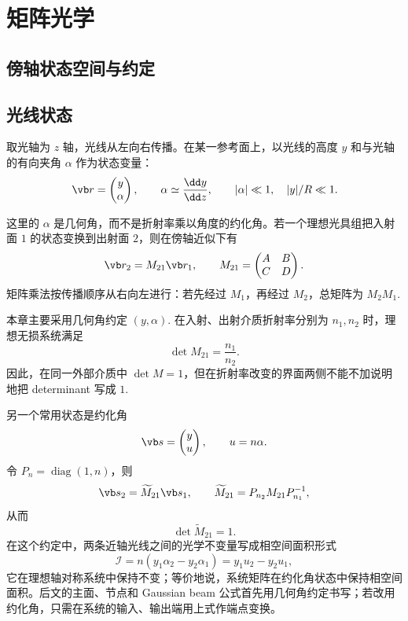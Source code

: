 \chapter{矩阵光学}

\section{傍轴状态空间与约定}

\section{光线状态}

取光轴为 \(z\) 轴，光线从左向右传播。在某一参考面上，以光线的高度 \(y\) 和与光轴的有向夹角 \(\alpha\) 作为状态变量：
\begin{equation}
	\vb r=
	\begin{pmatrix}
		y\\ \alpha
	\end{pmatrix},
	\qquad
	\alpha\simeq \frac{\dd y}{\dd z},
	\qquad
	|\alpha|\ll 1,\quad |y|/R\ll 1.
\end{equation}

这里的 \(\alpha\) 是几何角，而不是折射率乘以角度的约化角。若一个理想光具组把入射面 \(1\) 的状态变换到出射面 \(2\)，则在傍轴近似下有
\begin{equation}
	\vb r_2=M_{21}\vb r_1,\qquad
	M_{21}=
	\begin{pmatrix}
		A&B\\ C&D
	\end{pmatrix}.
\end{equation}
矩阵乘法按传播顺序从右向左进行：若先经过 \(M_1\)，再经过 \(M_2\)，总矩阵为 \(M_2M_1\).

本章主要采用几何角约定 \((y,\alpha)\). 在入射、出射介质折射率分别为 \(n_1,n_2\) 时，理想无损系统满足
\begin{equation}
	\det M_{21}=\frac{n_1}{n_2}.
\end{equation}
因此，在同一外部介质中 \(\det M=1\)，但在折射率改变的界面两侧不能不加说明地把 determinant 写成 \(1\).

另一个常用状态是约化角
\begin{equation}
	\vb s=
	\begin{pmatrix}
		y\\ u
	\end{pmatrix},
	\qquad u=n\alpha.
\end{equation}
令 \(P_n=\operatorname{diag}(1,n)\)，则
\begin{equation}
	\vb s_2=\widetilde M_{21}\vb s_1,\qquad
	\widetilde M_{21}=P_{n_2}M_{21}P_{n_1}^{-1},
\end{equation}
从而
\begin{equation}
	\det\widetilde M_{21}=1.
\end{equation}
	在这个约定中，两条近轴光线之间的光学不变量写成相空间面积形式
\begin{equation}
	\mathcal I
	=n\left(y_1\alpha_2-y_2\alpha_1\right)
	=y_1u_2-y_2u_1,
\end{equation}
	它在理想轴对称系统中保持不变；等价地说，系统矩阵在约化角状态中保持相空间面积。后文的主面、节点和 Gaussian beam 公式首先用几何角约定书写；若改用约化角，只需在系统的输入、输出端用上式作端点变换。

